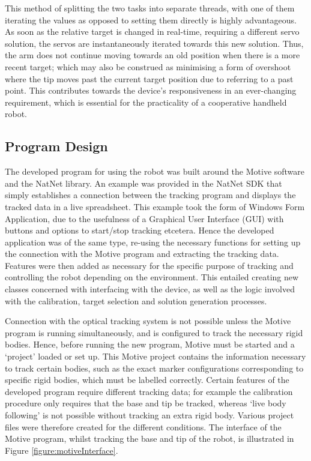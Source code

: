 \documentclass[11pt]{article}
\begin{document}
This method of splitting the two tasks into separate threads, with one of them iterating the values as opposed to setting them directly is highly advantageous. As soon as the relative target is changed in real-time, requiring a different servo solution, the servos are instantaneously iterated towards this new solution. Thus, the arm does not continue moving towards an old position when there is a more recent target; which may also be construed as minimising a form of overshoot where the tip moves past the current target position due to referring to a past point. This contributes towards the device's responsiveness in an ever-changing requirement, which is essential for the practicality of a cooperative handheld robot. 


\pagebreak
\subsection{Program Design}
\label{section:programDesign}

The developed program for using the robot was built around the Motive software and the NatNet library. An example was provided in the NatNet SDK that simply establishes a connection between the tracking program and displays the tracked data in a live spreadsheet. This example took the form of Windows Form Application, due to the usefulness of a Graphical User Interface (GUI) with buttons and options to start/stop tracking etcetera. Hence the developed application was of the same type, re-using the necessary functions for setting up the connection with the Motive program and extracting the tracking data. Features were then added as necessary for the specific purpose of tracking and controlling the robot depending on the environment. This entailed creating new classes concerned with interfacing with the device, as well as the logic involved with the calibration, target selection and solution generation processes. 

Connection with the optical tracking system is not possible unless the Motive program is running simultaneously, and is configured to track the necessary rigid bodies. Hence, before running the new program, Motive must be started and a `project' loaded or set up. This Motive project contains the information necessary to track certain bodies, such as the exact marker configurations corresponding to specific rigid bodies, which must be labelled correctly. Certain features of the developed program require different tracking data; for example the calibration procedure only requires that the base and tip be tracked, whereas `live body following' is not possible without tracking an extra rigid body. Various project files were therefore created for the different conditions. The interface of the Motive program, whilst tracking the base and tip of the robot, is illustrated in Figure \ref{figure:motiveInterface}.
\end{document}
